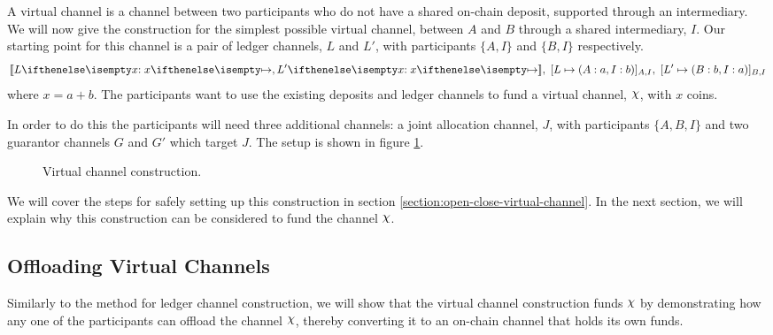 A virtual channel is a channel between two participants who do not have a shared on-chain deposit, supported through an intermediary.
We will now give the construction for the simplest possible virtual channel, between $A$ and $B$ through a shared intermediary, $I$.
Our starting point for this channel is a pair of ledger channels, $L$ and $L'$, with participants $\{A,I\}$ and $\{B,I\}$ respectively.
\begin{align}
  \adj{\holds{L}{x}{}, \holds{L'}{x}{}}, \; \finalizable{L}{\alloc{A:a, I:b}}{A, I}, \; \finalizable{L'}{\alloc{B: b, I: a}}{B, I} \label{eq:virtual-channel-start-state}
\end{align}
where $x = a + b$.
The participants want to use the existing deposits and ledger channels to fund a virtual channel, $\rchi$, with $x$ coins.

In order to do this the participants will need three additional channels: a joint allocation channel, $J$, with participants $\{A, B, I\}$ and two guarantor channels $G$ and $G'$ which target $J$. The setup is shown in figure \ref{fig:virtual-channel-construction}.

\begin{figure}[ht]
  \centering
  
  \caption{Virtual channel construction.}
  \label{fig:virtual-channel-construction}
\end{figure}

We will cover the steps for safely setting up this construction in section \ref{section:open-close-virtual-channel}. 
In the next section, we will explain why this construction can be considered to fund the channel $\rchi$.

\subsection{Offloading Virtual Channels}

Similarly to the method for ledger channel construction, we will show that the virtual channel construction funds $\rchi$ by demonstrating how any one of the participants can offload the channel $\rchi$, thereby converting it to an on-chain channel that holds its own funds.


